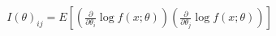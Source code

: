 \documentclass[preview]{standalone}
\begin{document}
\begin{align*}
I(\theta)_{ij} = E\left[\left(\frac{\partial}{\partial\theta_i} \log f(x;\theta)\right)\left(\frac{\partial}{\partial\theta_j} \log f(x;\theta)\right)\right]
\end{align*}
\end{document}
